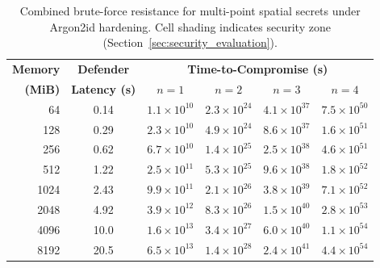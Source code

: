 \documentclass[journal,article,accept,pdftex,moreauthors]{Definitions/mdpi}
\begin{document}
\begin{table}[H]
\caption{Combined brute-force resistance for multi-point spatial secrets under Argon2id hardening. Cell shading indicates security zone (Section~\ref{sec:security_evaluation}).}
\label{tab:combined_spatial_computational}
\centering
\begin{tabular}{rccccc}
\toprule
\textbf{Memory} & \textbf{Defender} & \multicolumn{4}{c}{\textbf{Time-to-Compromise (s)}} \\
\textbf{(MiB)} & \textbf{Latency (s)} & \textbf{$n=1$} & \textbf{$n=2$} & \textbf{$n=3$} & \textbf{$n=4$} \\
\midrule
64   & 0.14 &
\cellcolor{humanscale}$1.1\times10^{10}$ &
\cellcolor{humanscale}$2.3\times10^{24}$ &
\cellcolor{supersecure}$4.1\times10^{37}$ &
\cellcolor{supersecure}$7.5\times10^{50}$ \\

128  & 0.29 &
\cellcolor{humanscale}$2.3\times10^{10}$ &
\cellcolor{humanscale}$4.9\times10^{24}$ &
\cellcolor{supersecure}$8.6\times10^{37}$ &
\cellcolor{supersecure}$1.6\times10^{51}$ \\

256  & 0.62 &
\cellcolor{humanscale}$6.7\times10^{10}$ &
\cellcolor{humanscale}$1.4\times10^{25}$ &
\cellcolor{supersecure}$2.5\times10^{38}$ &
\cellcolor{supersecure}$4.6\times10^{51}$ \\

512  & 1.22 &
\cellcolor{humanscale}$2.5\times10^{11}$ &
\cellcolor{humanscale}$5.3\times10^{25}$ &
\cellcolor{supersecure}$9.6\times10^{38}$ &
\cellcolor{supersecure}$1.8\times10^{52}$ \\

1024 & 2.43 &
\cellcolor{humanscale}$9.9\times10^{11}$ &
\cellcolor{humanscale}$2.1\times10^{26}$ &
\cellcolor{supersecure}$3.8\times10^{39}$ &
\cellcolor{supersecure}$7.1\times10^{52}$ \\

2048 & 4.92 &
\cellcolor{humanscale}$3.9\times10^{12}$ &
\cellcolor{humanscale}$8.3\times10^{26}$ &
\cellcolor{supersecure}$1.5\times10^{40}$ &
\cellcolor{supersecure}$2.8\times10^{53}$ \\

4096 & 10.0 &
\cellcolor{humanscale}$1.6\times10^{13}$ &
\cellcolor{humanscale}$3.4\times10^{27}$ &
\cellcolor{supersecure}$6.0\times10^{40}$ &
\cellcolor{supersecure}$1.1\times10^{54}$ \\

8192 & 20.5 &
\cellcolor{humanscale}$6.5\times10^{13}$ &
\cellcolor{humanscale}$1.4\times10^{28}$ &
\cellcolor{supersecure}$2.4\times10^{41}$ &
\cellcolor{supersecure}$4.4\times10^{54}$ \\


\end{tabular}
\end{table}
\end{document}
